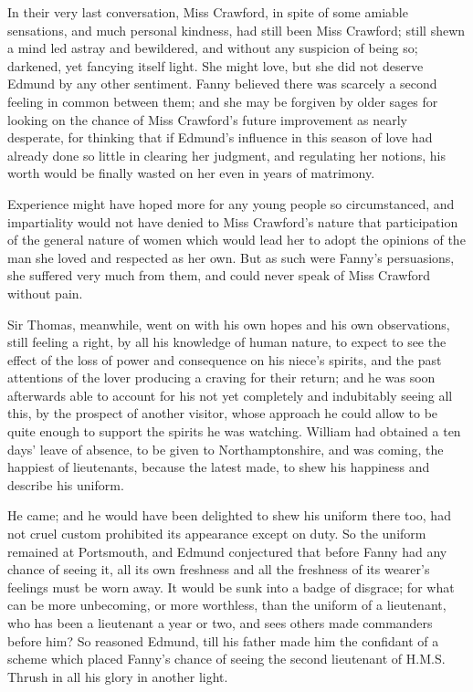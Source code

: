 \documentclass{article}
\begin{document}
In their very last conversation, Miss Crawford, in spite
of some amiable sensations, and much personal kindness,
had still been Miss Crawford; still shewn a mind led astray
and bewildered, and without any suspicion of being so;
darkened, yet fancying itself light.  She might love,
but she did not deserve Edmund by any other sentiment.
Fanny believed there was scarcely a second feeling
in common between them; and she may be forgiven by older
sages for looking on the chance of Miss Crawford's future
improvement as nearly desperate, for thinking that if Edmund's
influence in this season of love had already done so little
in clearing her judgment, and regulating her notions,
his worth would be finally wasted on her even in years
of matrimony.

Experience might have hoped more for any young people
so circumstanced, and impartiality would not have denied
to Miss Crawford's nature that participation of the general
nature of women which would lead her to adopt the opinions
of the man she loved and respected as her own.  But as such
were Fanny's persuasions, she suffered very much from them,
and could never speak of Miss Crawford without pain.

Sir Thomas, meanwhile, went on with his own hopes and
his own observations, still feeling a right, by all his
knowledge of human nature, to expect to see the effect
of the loss of power and consequence on his niece's spirits,
and the past attentions of the lover producing a craving
for their return; and he was soon afterwards able to account
for his not yet completely and indubitably seeing all this,
by the prospect of another visitor, whose approach he
could allow to be quite enough to support the spirits
he was watching.  William had obtained a ten days'
leave of absence, to be given to Northamptonshire,
and was coming, the happiest of lieutenants, because the
latest made, to shew his happiness and describe his uniform.

He came; and he would have been delighted to shew his uniform
there too, had not cruel custom prohibited its appearance
except on duty.  So the uniform remained at Portsmouth,
and Edmund conjectured that before Fanny had any chance
of seeing it, all its own freshness and all the freshness
of its wearer's feelings must be worn away.  It would be sunk
into a badge of disgrace; for what can be more unbecoming,
or more worthless, than the uniform of a lieutenant,
who has been a lieutenant a year or two, and sees
others made commanders before him?  So reasoned Edmund,
till his father made him the confidant of a scheme which
placed Fanny's chance of seeing the second lieutenant
of H.M.S. Thrush in all his glory in another light.
\end{document}
